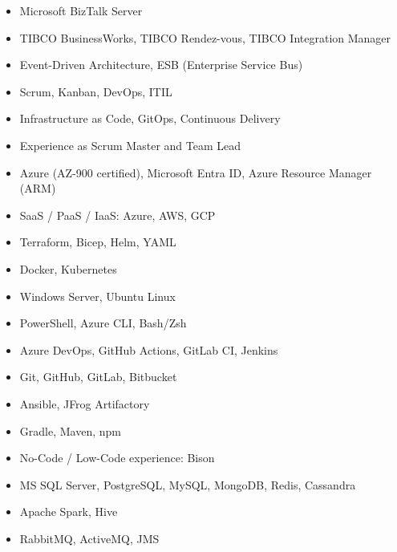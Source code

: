 \begin{cvcolumns}
        {\begin{itemize}
            \item Microsoft BizTalk Server
            \item TIBCO BusinessWorks, TIBCO Rendez-vous, TIBCO Integration Manager
            \item Event-Driven Architecture, ESB (Enterprise Service Bus)
        \end{itemize}}
        {\begin{itemize}
            \item Scrum, Kanban, DevOps, ITIL
            \item Infrastructure as Code, GitOps, Continuous Delivery
            \item Experience as Scrum Master and Team Lead
        \end{itemize}}
\end{cvcolumns}


{\begin{itemize}
    \item Azure (AZ-900 certified), Microsoft Entra ID, Azure Resource Manager (ARM)
    \item SaaS / PaaS / IaaS: Azure, AWS, GCP
    \item Terraform, Bicep, Helm, YAML
    \item Docker, Kubernetes
    \item Windows Server, Ubuntu Linux
    \item PowerShell, Azure CLI, Bash/Zsh
\end{itemize}}

{\begin{itemize}
    \item Azure DevOps, GitHub Actions, GitLab CI, Jenkins
    \item Git, GitHub, GitLab, Bitbucket
    \item Ansible, JFrog Artifactory
    \item Gradle, Maven, npm
    \item No-Code / Low-Code experience: Bison
\end{itemize}}



{\begin{itemize}
    \item MS SQL Server, PostgreSQL, MySQL, MongoDB, Redis, Cassandra
    \item Apache Spark, Hive
    \item RabbitMQ, ActiveMQ, JMS
\end{itemize}}

